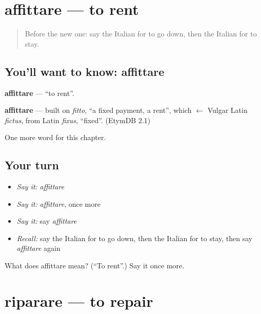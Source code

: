 \section[affittare]{affittare — to rent}

\label{lesson:IT-C135-affittare}



\begin{quote}
Before the new one: say the Italian for to go down, then the Italian for to stay.
\end{quote}

\subsection*{You'll want to know: affittare}
\textbf{affittare} — \textquotedblleft{}to rent\textquotedblright{}.

\begin{cousinweb}
\textbf{affittare} — built on \emph{fitto}, \textquotedblleft{}a fixed payment, a rent\textquotedblright{}, which $\leftarrow$ Vulgar Latin \emph{fictus}, from Latin \emph{fixus}, \textquotedblleft{}fixed\textquotedblright{}. (EtymDB 2.1)
\end{cousinweb}

\begin{grammarlens}[title={What you've built}]
One more word for this chapter.
\end{grammarlens}

\subsection*{Your turn}
\begin{itemize}
\raggedright
  \item \emph{Say it:} \emph{affittare}
  \item \emph{Say it:} \emph{affittare}, once more
  \item \emph{Say it:} say \emph{affittare}
  \item \emph{Recall:} say the Italian for to go down, then the Italian for to stay, then say \emph{affittare} again
\end{itemize}

\begin{tcolorbox}[breakable,colback=teal!4,colframe=teal!35!black,title={Before you move on}]
What does affittare mean? (\textquotedblleft{}To rent\textquotedblright{}.) Say it once more.
\end{tcolorbox}
\section[riparare]{riparare — to repair}

